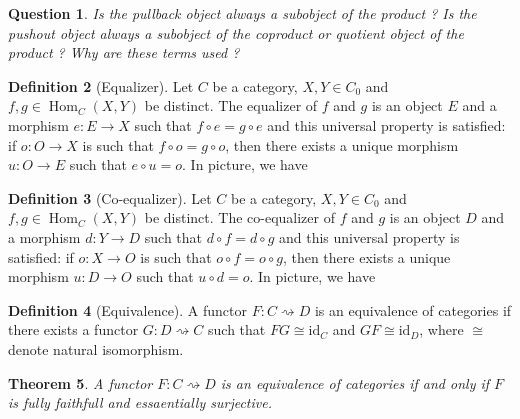 \documentclass{scrartcl}
\newtheorem{thm}{Theorem}
\newtheorem{quest}[thm]{Question}
\theoremstyle{definition}
\newtheorem{defn}[thm]{Definition}
\theoremstyle{remark}
\DeclareMathOperator{\Hom}{Hom}
\newcommand{\id}{\text{id}}
\begin{document}
\begin{quest}
    Is the pullback object always a subobject of the product ? Is the pushout object always a subobject of the coproduct or quotient object of the product ? Why are these terms used ?
\end{quest}

\begin{defn}[Equalizer]
    Let $C$ be a category, $X,Y \in C_0$ and $f,g \in \Hom_C(X,Y)$ be distinct. The equalizer of $f$ and $g$ is an object $E$ and a morphism $e: E\rightarrow X$ such that $f\circ e = g \circ e$ and this universal property is satisfied: if $o: O\rightarrow X$ is such that $f\circ o = g \circ o$, then there exists a unique morphism $u:O\rightarrow E$ such that $e\circ u= o$. In picture, we have 
    \begin{figure}[H]
        \centering
    \end{figure}
\end{defn}
\begin{defn}[Co-equalizer]
    Let $C$ be a category, $X,Y \in C_0$ and $f,g \in \Hom_C(X,Y)$ be distinct. The co-equalizer of $f$ and $g$ is an object $D$ and a morphism $d: Y\rightarrow D$ such that $d\circ f = d \circ g$ and this universal property is satisfied: if $o: X\rightarrow O$ is such that $o\circ f = o \circ g$, then there exists a unique morphism $u:D\rightarrow O$ such that $u\circ d= o$. In picture, we have
    \begin{figure}[H]
        \centering
    \end{figure}
\end{defn}



\begin{defn}[Equivalence]
    A functor $F:C\rightsquigarrow D$ is an equivalence of categories if there exists a functor $G:D\rightsquigarrow C$ such that $FG\cong \id_{C}$ and $GF \cong \id_{D}$, where $\cong$ denote natural isomorphism. 
\end{defn}
\begin{thm}
    A functor $F:C\rightsquigarrow D$ is an equivalence of categories if and only if $F$ is fully faithfull and essaentially surjective.
\end{thm}
\end{document}
